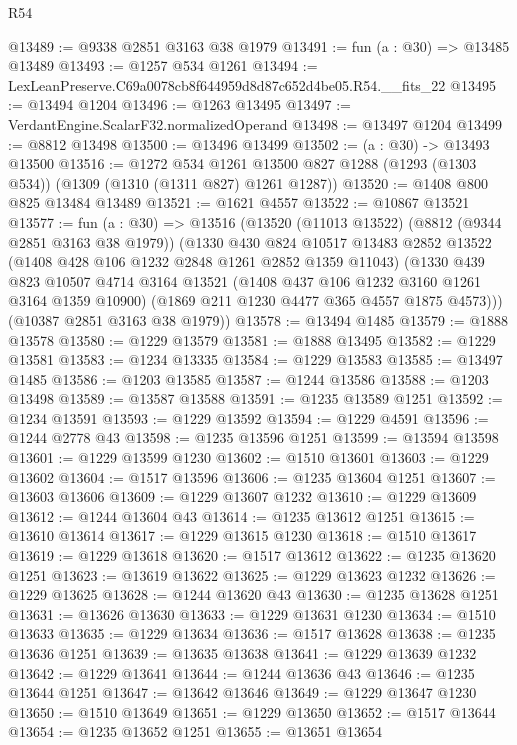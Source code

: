 \begin{lexlean}{R54}
\begin{coremodule}
@13489 := @9338 @2851 @3163 @38 @1979
@13491 := fun (a : @30) => @13485 @13489
@13493 := @1257 @534 @1261
@13494 := LexLeanPreserve.C69a0078cb8f644959d8d87c652d4be05.R54.__fits_22
@13495 := @13494 @1204
@13496 := @1263 @13495
@13497 := VerdantEngine.ScalarF32.normalizedOperand
@13498 := @13497 @1204
@13499 := @8812 @13498
@13500 := @13496 @13499
@13502 := (a : @30) -> @13493 @13500
@13516 := @1272
    @534
    @1261
    @13500
    @827
    @1288
    (@1293 (@1303 @534))
    (@1309 (@1310 (@1311 @827) @1261 @1287))
@13520 := @1408 @800 @825 @13484 @13489
@13521 := @1621 @4557
@13522 := @10867 @13521
@13577 := fun (a : @30) =>
  @13516
    (@13520
      (@11013 @13522)
      (@8812 (@9344 @2851 @3163 @38 @1979))
      (@1330
        @430
        @824
        @10517
        @13483
        @2852
        @13522
        (@1408 @428 @106 @1232 @2848 @1261 @2852 @1359 @11043)
        (@1330
          @439
          @823
          @10507
          @4714
          @3164
          @13521
          (@1408 @437 @106 @1232 @3160 @1261 @3164 @1359 @10900)
          (@1869 @211 @1230 @4477 @365 @4557 @1875 @4573)))
      (@10387 @2851 @3163 @38 @1979))
@13578 := @13494 @1485
@13579 := @1888 @13578
@13580 := @1229 @13579
@13581 := @1888 @13495
@13582 := @1229 @13581
@13583 := @1234 @13335
@13584 := @1229 @13583
@13585 := @13497 @1485
@13586 := @1203 @13585
@13587 := @1244 @13586
@13588 := @1203 @13498
@13589 := @13587 @13588
@13591 := @1235 @13589 @1251
@13592 := @1234 @13591
@13593 := @1229 @13592
@13594 := @1229 @4591
@13596 := @1244 @2778 @43
@13598 := @1235 @13596 @1251
@13599 := @13594 @13598
@13601 := @1229 @13599 @1230
@13602 := @1510 @13601
@13603 := @1229 @13602
@13604 := @1517 @13596
@13606 := @1235 @13604 @1251
@13607 := @13603 @13606
@13609 := @1229 @13607 @1232
@13610 := @1229 @13609
@13612 := @1244 @13604 @43
@13614 := @1235 @13612 @1251
@13615 := @13610 @13614
@13617 := @1229 @13615 @1230
@13618 := @1510 @13617
@13619 := @1229 @13618
@13620 := @1517 @13612
@13622 := @1235 @13620 @1251
@13623 := @13619 @13622
@13625 := @1229 @13623 @1232
@13626 := @1229 @13625
@13628 := @1244 @13620 @43
@13630 := @1235 @13628 @1251
@13631 := @13626 @13630
@13633 := @1229 @13631 @1230
@13634 := @1510 @13633
@13635 := @1229 @13634
@13636 := @1517 @13628
@13638 := @1235 @13636 @1251
@13639 := @13635 @13638
@13641 := @1229 @13639 @1232
@13642 := @1229 @13641
@13644 := @1244 @13636 @43
@13646 := @1235 @13644 @1251
@13647 := @13642 @13646
@13649 := @1229 @13647 @1230
@13650 := @1510 @13649
@13651 := @1229 @13650
@13652 := @1517 @13644
@13654 := @1235 @13652 @1251
@13655 := @13651 @13654

\end{coremodule}
\end{lexlean}
